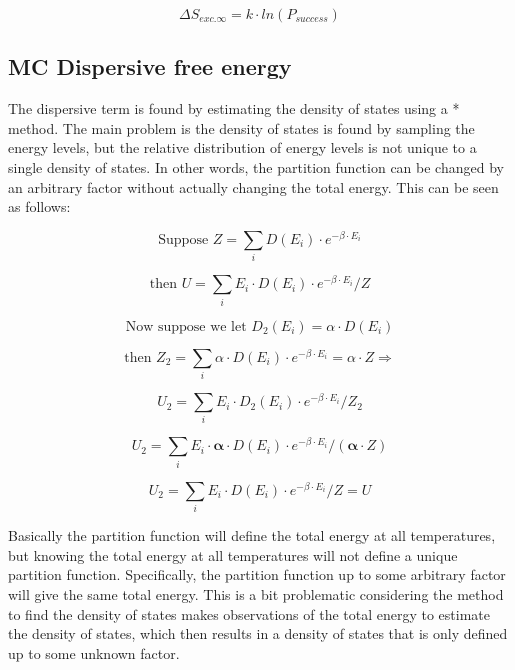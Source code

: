 \begin{equation}\label{eq:MCHS26}
\Delta S_{exc.\infty}=k\cdot ln(P_{success})
\end{equation}

\subsection{MC Dispersive free energy}
The dispersive term is found by estimating the density of states using a * method. The main problem is the density of states is found by sampling the energy levels, but the relative distribution of energy levels is not unique to a single density of states. In other words, the partition function can be changed by an arbitrary factor without actually changing the total energy. This can be seen as follows:

\begin{equation}\label{eq:MCDISP1}
\text{Suppose }Z=\sum_i D(E_i)\cdot e^{-\beta\cdot E_i}
\end{equation}

\begin{equation}\label{eq:MCDISP1}
\text{then }U=\sum_i E_i\cdot D(E_i)\cdot e^{-\beta\cdot E_i}/Z
\end{equation}

\begin{equation}\label{eq:MCDISP1}
\text{Now suppose we let }D_2(E_i)=\alpha\cdot D(E_i)
\end{equation}

\begin{equation}\label{eq:MCDISP1}
\text{then }Z_2=\sum_i \alpha\cdot D(E_i)\cdot e^{-\beta\cdot E_i}=\alpha\cdot Z\Rightarrow
\end{equation}

\begin{equation}\label{eq:MCDISP1}
U_2=\sum_i E_i\cdot D_2(E_i)\cdot e^{-\beta\cdot E_i}/Z_2
\end{equation}


\begin{equation}\label{eq:MCDISP1}
U_2=\sum_i E_i\cdot \boldsymbol{\alpha}\cdot D(E_i)\cdot e^{-\beta\cdot E_i}/(\boldsymbol{\alpha}\cdot Z)
\end{equation}


\begin{equation}\label{eq:MCDISP1}
U_2=\sum_i E_i\cdot D(E_i)\cdot e^{-\beta\cdot E_i}/Z=U
\end{equation}

Basically the partition function will define the total energy at all temperatures, but knowing the total energy at all temperatures will not define a unique partition function. Specifically, the partition function up to some arbitrary factor will give the same total energy. This is a bit problematic considering the method to find the density of states makes observations of the total energy to estimate the density of states, which then results in a density of states that is only defined up to some unknown factor.

